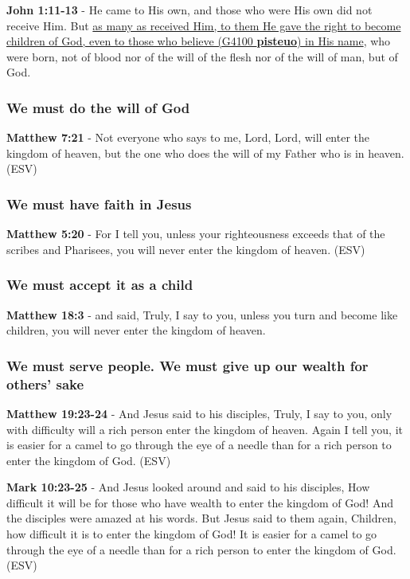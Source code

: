 \documentclass[11pt]{article}
\begin{document}
\textbf{John 1:11-13} - He came to His own, and those who were His own did not receive Him. But \uline{as many as received Him, to them He gave the right to become children of God, even to those who believe (G4100 \textbf{pisteuo}) in His name}, who were born, not of blood nor of the will of the flesh nor of the will of man, but of God.

\subsubsection{We must do the will of God}
\label{sec:org602deaf}
\textbf{Matthew 7:21} - Not everyone who says to me, Lord, Lord, will enter the kingdom of heaven, but the one who does the will of my Father who is in heaven. (ESV)

\subsubsection{We must have faith in Jesus}
\label{sec:org20f8205}
\textbf{Matthew 5:20} - For I tell you, unless your righteousness exceeds that of the scribes and Pharisees, you will never enter the kingdom of heaven. (ESV)

\subsubsection{We must accept it as a child}
\label{sec:org922a73a}
\textbf{Matthew 18:3} - and said, Truly, I say to you, unless you turn and become like children, you will never enter the kingdom of heaven.

\subsubsection{We must serve people. We must give up our wealth for others' sake}
\label{sec:org4037c07}
\textbf{Matthew 19:23-24} - And Jesus said to his disciples, Truly, I say to you, only with difficulty will a rich person enter the kingdom of heaven. Again I tell you, it is easier for a camel to go through the eye of a needle than for a rich person to enter the kingdom of God. (ESV)

\textbf{Mark 10:23-25} - And Jesus looked around and said to his disciples, How difficult it will be for those who have wealth to enter the kingdom of God! And the disciples were amazed at his words. But Jesus said to them again, Children, how difficult it is to enter the kingdom of God! It is easier for a camel to go through the eye of a needle than for a rich person to enter the kingdom of God. (ESV)
\end{document}
